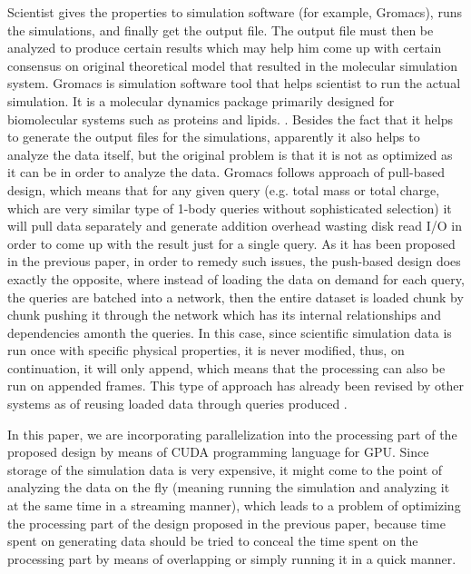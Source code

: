 \documentclass[10pt,journal,final,letterpaper,twocolumn]{IEEEtran}
\begin{document}
Scientist gives the properties to simulation software (for example, Gromacs), runs the simulations, and finally get the output file. The output file must then be analyzed to produce certain results which may help him come up with certain consensus on original theoretical model that resulted in the molecular simulation system\cite{Frenkel:api01}. Gromacs is simulation software tool that helps scientist to run the actual simulation. It is a molecular dynamics package primarily designed for biomolecular systems such as proteins and lipids. \cite{Gromacs-online}. Besides the fact that it helps to generate the output files for the simulations, apparently it also helps to analyze the data itself, but the original problem is that it is not as optimized as it can be in order to analyze the data. Gromacs follows approach of pull-based design, which means that for any given query (e.g. total mass or total charge, which are very similar type of 1-body queries without sophisticated selection) it will pull data separately and generate addition overhead wasting disk read I/O in order to come up with the result just for a single query. As it has been proposed in the previous paper, in order to remedy such issues, the push-based design does exactly the opposite, where instead of loading the data on demand for each query, the queries are batched into a network, then the entire dataset is loaded chunk by chunk pushing it through the network which has its internal relationships and dependencies amonth the queries. In this case, since scientific simulation data is run once with specific physical properties, it is never modified, thus, on continuation, it will only append, which means that the processing can also be run on appended frames. \cite{mainPaper}
This type of approach has already been revised by other systems \cite {DataPath,Volcano,Qpipe} as of reusing loaded data through queries produced \cite {Candea,PredictablePerformance,CooperativeScans}.

In this paper, we are incorporating parallelization into the processing part of the proposed design by means of CUDA programming language for GPU. Since storage of the simulation data is very expensive, it might come to the point of analyzing the data on the fly (meaning running the simulation and analyzing it at the same time in a streaming manner), which leads to a problem of optimizing the processing part of the design proposed in the previous paper, because time spent on generating data should be tried to conceal the time spent on the processing part by means of overlapping or simply running it in a quick manner.
\end{document}
